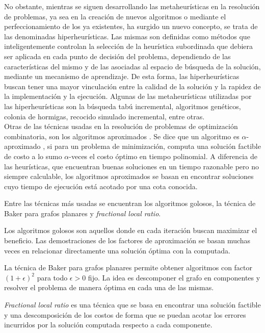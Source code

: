 \documentclass[a4paper,openright,11pt,oneside]{book}
\begin{document}
	No obstante, mientras se siguen desarrollando las metaheurísticas en la resolución de problemas, ya sea en la  creación  de nuevos algoritmos o mediante el perfeccionamiento de los ya existentes, ha surgido un nuevo concepto, se trata de las denominadas hiperheurísticas. Las mismas son definidas como métodos que inteligentemente controlan la selección de la heurística subordinada que debiera ser aplicada en cada punto de decisión del problema, dependiendo de las características del mismo y de las asociadas al espacio de búsqueda de la solución, mediante un mecanismo de aprendizaje. De esta forma, las hiperheurísticas buscan  tener una mayor vinculación entre la calidad de la solución y la rapidez de la implementación y la ejecución. Algunas de las metaheurísticas utilizadas por las hiperheurísticas son  la búsqueda  tabú  incremental, algoritmos genéticos, colonia de hormigas, recocido simulado incremental, entre otras. \\
	
	Otras de las técnicas usadas en la resolución de problemas de optimización combinatoria, son los algoritmos aproximados \cite{vasiliev2018algoritmos}. Se dice que un algoritmo es $\alpha$-aproximado \cite{johnson1974approximation}, si para un problema de minimización, computa una solución factible de costo a lo sumo $\alpha$-veces el costo óptimo en tiempo polinomial. A diferencia de las heurísticas, que encuentran buenas soluciones en un tiempo razonable pero no siempre calculable, los algoritmos aproximados se basan en encontrar soluciones cuyo tiempo de ejecución está acotado por una cota conocida.
	
	Entre las técnicas más usadas se encuentran los algoritmos golosos, la técnica de Baker para grafos planares y \emph{fractional local ratio}.
	
	Los algoritmos golosos son aquellos donde en cada iteración buscan maximizar el beneficio. Las demostraciones de los factores de aproximación se basan muchas veces en relacionar directamente una solución óptima con la computada.
	
	La técnica de Baker para grafos planares permite obtener algoritmos con factor $(1+ \epsilon)^2$ para todo $\epsilon > 0$ fijo. La idea es descomponer el grafo en componentes y resolver el problema de manera óptima en cada una de las mismas.
	
	\emph{Fractional local ratio} es una técnica que se basa en encontrar una solución factible y una descomposición de los costos de forma que se puedan acotar los errores incurridos por la solución computada respecto a cada componente.
		
\end{document}
